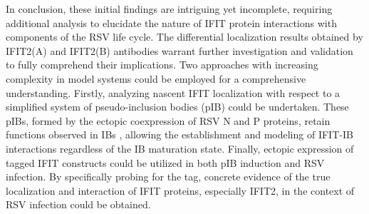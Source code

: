 In conclusion, these initial findings are intriguing yet incomplete, requiring additional analysis to elucidate the nature of IFIT protein interactions with components of the RSV life cycle. The differential localization results obtained by IFIT2(A) and IFIT2(B) antibodies warrant further investigation and validation to fully comprehend their implications. Two approaches with increasing complexity in model systems could be employed for a comprehensive understanding. Firstly, analyzing nascent IFIT localization with respect to a simplified system of pseudo-inclusion bodies (pIB) could be undertaken. These pIBs, formed by the ectopic coexpression of RSV N and P proteins, retain functions observed in IBs \cite{Rincheval2017FunctionalVirus, Galloux2020MinimalVitro, Jobe2020RespiratorySignaling}, allowing the establishment and modeling of IFIT-IB interactions regardless of the IB maturation state. Finally, ectopic expression of tagged IFIT constructs could be utilized in both pIB induction and RSV infection. By specifically probing for the tag, concrete evidence of the true localization and interaction of IFIT proteins, especially IFIT2, in the context of RSV infection could be obtained.

